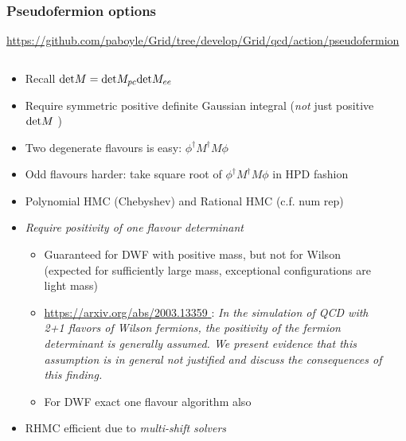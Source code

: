 \documentclass[pdf,ps,8pt]{beamer}
\newcommand{\link}[1]{\href{#1}{ {\color{blue} #1} }}
\begin{document}
\begin{frame}[fragile]\small\frametitle{ Pseudofermion options }

\link{https://github.com/paboyle/Grid/tree/develop/Grid/qcd/action/pseudofermion}

\begin{columns}
\begin{column}{0.75\textwidth}
\begin{itemize}
\item Recall ${\rm det} M = {\rm det} M_{pc} {\rm det} M_{ee}$
\item Require symmetric positive definite Gaussian integral (\emph{not} just positive ${\rm det} M$ )
\item Two degenerate flavours is easy: $\phi^\dagger M^\dagger M \phi$
\item Odd flavours harder: take square root of $\phi^\dagger M^\dagger M \phi$ in HPD fashion
\item Polynomial HMC (Chebyshev) and Rational HMC (c.f. num rep)
\item \emph{Require positivity of one flavour determinant} 
\begin{itemize}
\item Guaranteed for DWF with positive mass, but not for Wilson (expected for sufficiently large mass, exceptional configurations are light mass)
\item \link{https://arxiv.org/abs/2003.13359}: \emph{In the simulation of QCD with 2+1 flavors of Wilson fermions, the positivity of the fermion determinant is generally assumed. We present evidence that this assumption is in general not justified and discuss the consequences of this finding.}
\item For DWF exact one flavour algorithm also
\end{itemize}
\item RHMC efficient due to \emph{multi-shift solvers}
\end{itemize}
\end{column}
\begin{column}{0.25\textwidth}

\end{column}
\end{columns}
\end{frame}
\end{document}
